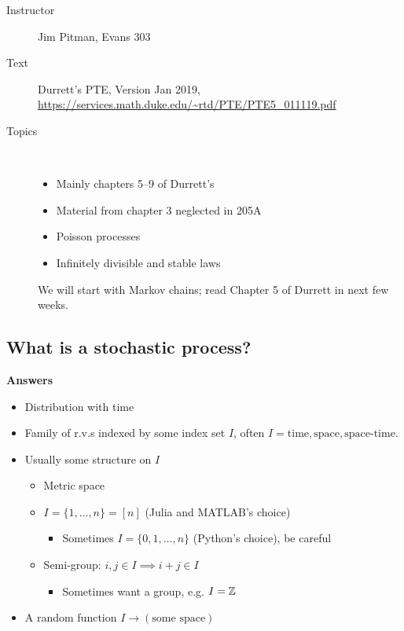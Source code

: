 
\begin{description}
  \item[Instructor] Jim Pitman, Evans 303
  \item[Text] Durrett's PTE, Version Jan 2019,
    \url{https://services.math.duke.edu/~rtd/PTE/PTE5_011119.pdf}
  \item[Topics]~
    \begin{itemize}
      \item Mainly chapters 5--9 of Durrett's
      \item Material from chapter 3 neglected in 205A
      \item Poisson processes
      \item Infinitely divisible and stable laws
    \end{itemize}
    We will start with Markov chains; read Chapter 5 of Durrett in
    next few weeks.
\end{description}


\subsection{What is a stochastic process?}

\textbf{Answers}

\begin{itemize}
  \item Distribution with time
  \item Family of r.v.s indexed by some index set $I$, often
    $I = \text{time}, \text{space}, \text{space-time}$.
  \item Usually some structure on $I$
    \begin{itemize}
      \item Metric space
      \item $I = \{1,\ldots,n\} = [n]$ (Julia and MATLAB's choice)
        \begin{itemize}
          \item Sometimes $I = \{0, 1,\ldots,n\}$ (Python's choice), be careful
        \end{itemize}
      \item Semi-group: $i,j \in I \implies i+j \in I$
        \begin{itemize}
          \item Sometimes want a group, e.g. $I = \mathbb{Z}$
        \end{itemize}
    \end{itemize}
  \item A random function $I \to (\text{some space})$
\end{itemize}

